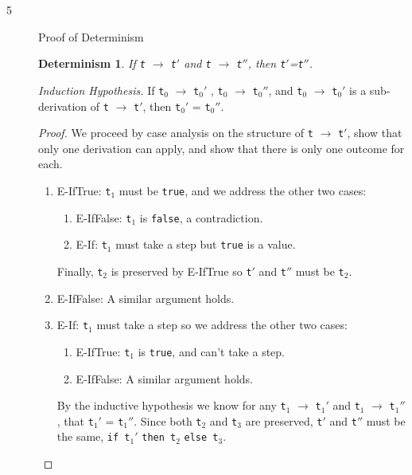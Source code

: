 \documentclass{article}
\newtheorem{deter}{Determinism}
\begin{document}
\begin{description}
\newpage

  \item[5]{Proof of Determinism}
    \begin{deter}If \verb|t| $\longrightarrow$ \verb|t|$'$ and \verb|t| $\longrightarrow$ \verb|t|$''$, then \verb|t|$'$=\verb|t|$''$.
    \end{deter}

    \textit{Induction Hypothesis.} If \verb|t|$_0$ $\longrightarrow$ \verb|t|$_0'$ , \verb|t|$_0$ $\longrightarrow$ \verb|t|$_0''$, and \verb|t|$_0$ $\longrightarrow$ \verb|t|$_0'$ is a sub-derivation of \verb|t| $\longrightarrow$ \verb|t|$'$, then \verb|t|$_0'$ = \verb|t|$_0''$.

    \begin{proof}
      We proceed by case analysis on the structure of \verb|t| $\longrightarrow$ \verb|t|$'$, show that only one derivation can apply, and show that there is only one outcome for each.

      \begin{enumerate}
        \item E-IfTrue: \verb|t|$_1$ must be \verb|true|, and we address the other two cases:
          \begin{enumerate}
            \item E-IfFalse: \verb|t|$_1$ is \verb|false|, a contradiction.
            \item E-If: \verb|t|$_1$ must take a step but \verb|true| is a value.
          \end{enumerate}

          Finally, \verb|t|$_2$ is preserved by E-IfTrue so \verb|t|$'$ and \verb|t|$''$ must be \verb|t|$_2$.

        \item E-IfFalse: A similar argument holds.

        \item E-If: \verb|t|$_1$ must take a step so we address the other two cases:
          \begin{enumerate}
            \item E-IfTrue: \verb|t|$_1$ is \verb|true|, and can't take a step.
            \item E-IfFalse: A similar argument holds.
          \end{enumerate}

          By the inductive hypothesis we know for any \verb|t|$_1$ $\longrightarrow$ \verb|t|$_1'$ and \verb|t|$_1$ $\longrightarrow$ \verb|t|$_1''$, that \verb|t|$_1'$ = \verb|t|$_1''$. Since both \verb|t|$_2$ and \verb|t|$_3$ are preserved, \verb|t|$'$ and \verb|t|$''$ must be the same, \verb|if t|$_1'$ \verb|then t|$_2$ \verb|else t|$_3$.
      \end{enumerate}


\end{proof}
\end{description}
\end{document}
